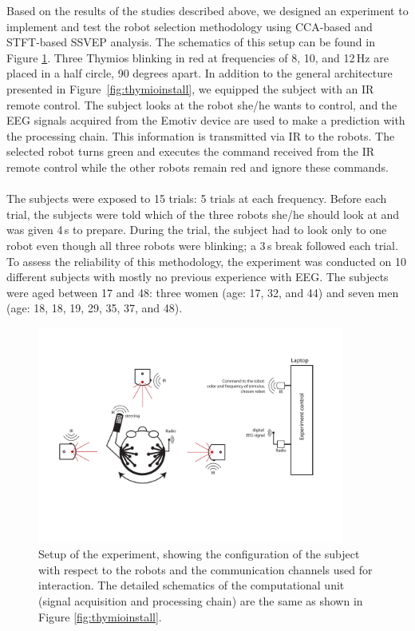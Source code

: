 \documentclass[smallextended]{svjour3}
\begin{document}
Based on the results of the studies described above, we designed an experiment to implement and test the robot selection methodology using CCA-based and STFT-based SSVEP analysis. The schematics of this setup can be found in Figure \ref{fig:experiment-set-up}. 
Three Thymios blinking in red at frequencies of 8, 10, and 12\,Hz are placed in a half circle, 90 degrees apart.
In addition to the general architecture presented in Figure~\ref{fig:thymioinstall}, we equipped the subject with an IR remote control.
The subject looks at the robot she/he wants to control, and the EEG signals acquired from the Emotiv device are used to make a prediction with the processing chain.
This information is transmitted via IR to the robots.
The selected robot turns green and executes the command received from the IR remote control while the other robots remain red and ignore these commands.\\
\\
The subjects were exposed to 15 trials: 5 trials at each frequency. Before each trial, the subjects were told which of the three robots she/he should look at and was given 4\,s to prepare. During the trial, the subject had to look only to one robot even though all three robots were blinking; a 3\,s break followed each trial.
To assess the reliability of this methodology, the experiment was conducted on 10 different subjects with mostly no previous experience with EEG.
The subjects were aged between 17 and 48: three women (age: 17, 32, and 44) and seven men (age: 18, 18, 19, 29, 35, 37, and 48). 

\begin{figure}
\center
\includegraphics[width=0.9\textwidth]{figures/schema-global2.pdf}
    \caption{Setup of the experiment, showing the configuration of the subject with respect to the robots and the communication channels used for interaction. The detailed schematics of the computational unit (signal acquisition and processing chain) are the same as shown in Figure \ref{fig:thymioinstall}.} \label{fig:experiment-set-up}
\end{figure}
\end{document}
